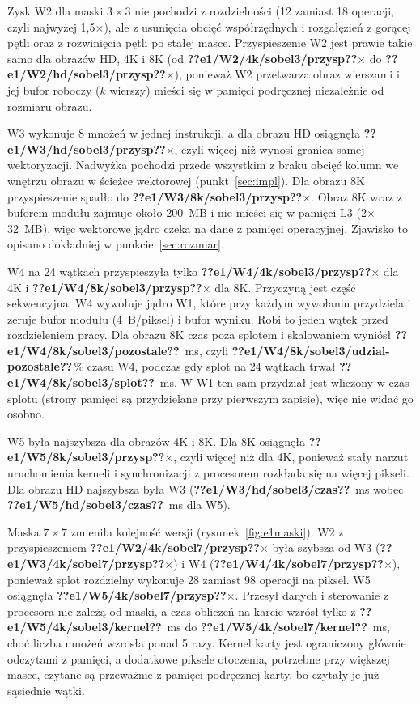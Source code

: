 \documentclass[12pt,a4paper]{article}
\providecommand{\wynik}[1]{\textbf{??#1??}}
\begin{document}
Zysk W2 dla maski $3\times3$ nie pochodzi z rozdzielności (12 zamiast 18 operacji, czyli najwyżej 1,5$\times$), ale z usunięcia obcięć współrzędnych i rozgałęzień z gorącej pętli oraz z rozwinięcia pętli po stałej masce. Przyspieszenie W2 jest prawie takie samo dla obrazów HD, 4K i 8K (od \wynik{e1/W2/4k/sobel3/przysp}$\times$ do \wynik{e1/W2/hd/sobel3/przysp}$\times$), ponieważ W2 przetwarza obraz wierszami i jej bufor roboczy ($k$ wierszy) mieści się w pamięci podręcznej niezależnie od rozmiaru obrazu.

W3 wykonuje 8 mnożeń w jednej instrukcji, a dla obrazu HD osiągnęła \wynik{e1/W3/hd/sobel3/przysp}$\times$, czyli więcej niż wynosi granica samej wektoryzacji. Nadwyżka pochodzi przede wszystkim z braku obcięć kolumn we wnętrzu obrazu w ścieżce wektorowej (punkt~\ref{sec:impl}). Dla obrazu 8K przyspieszenie spadło do \wynik{e1/W3/8k/sobel3/przysp}$\times$. Obraz 8K wraz z buforem modułu zajmuje około 200~MB i nie mieści się w pamięci L3 (2$\times$32~MB), więc wektorowe jądro czeka na dane z pamięci operacyjnej. Zjawisko to opisano dokładniej w punkcie~\ref{sec:rozmiar}.

W4 na 24 wątkach przyspieszyła tylko \wynik{e1/W4/4k/sobel3/przysp}$\times$ dla 4K i \wynik{e1/W4/8k/sobel3/przysp}$\times$ dla 8K. Przyczyną jest część sekwencyjna: W4 wywołuje jądro W1, które przy każdym wywołaniu przydziela i zeruje bufor modułu (4~B/piksel) i bufor wyniku. Robi to jeden wątek przed rozdzieleniem pracy. Dla obrazu 8K czas poza splotem i skalowaniem wyniósł \wynik{e1/W4/8k/sobel3/pozostale}~ms, czyli \wynik{e1/W4/8k/sobel3/udzial-pozostale}\,\% czasu W4, podczas gdy splot na 24 wątkach trwał \wynik{e1/W4/8k/sobel3/splot}~ms. W W1 ten sam przydział jest wliczony w czas splotu (strony pamięci są przydzielane przy pierwszym zapisie), więc nie widać go osobno.

W5 była najszybsza dla obrazów 4K i 8K. Dla 8K osiągnęła \wynik{e1/W5/8k/sobel3/przysp}$\times$, czyli więcej niż dla 4K, ponieważ stały narzut uruchomienia kerneli i synchronizacji z procesorem rozkłada się na więcej pikseli. Dla obrazu HD najszybsza była W3 (\wynik{e1/W3/hd/sobel3/czas}~ms wobec \wynik{e1/W5/hd/sobel3/czas}~ms dla W5).

Maska $7\times7$ zmieniła kolejność wersji (rysunek~\ref{fig:e1maski}). W2 z przyspieszeniem \wynik{e1/W2/4k/sobel7/przysp}$\times$ była szybsza od W3 (\wynik{e1/W3/4k/sobel7/przysp}$\times$) i W4 (\wynik{e1/W4/4k/sobel7/przysp}$\times$), ponieważ splot rozdzielny wykonuje 28 zamiast 98 operacji na piksel. W5 osiągnęła \wynik{e1/W5/4k/sobel7/przysp}$\times$. Przesył danych i sterowanie z procesora nie zależą od maski, a czas obliczeń na karcie wzrósł tylko z \wynik{e1/W5/4k/sobel3/kernel}~ms do \wynik{e1/W5/4k/sobel7/kernel}~ms, choć liczba mnożeń wzrosła ponad 5 razy. Kernel karty jest ograniczony głównie odczytami z pamięci, a dodatkowe piksele otoczenia, potrzebne przy większej masce, czytane są przeważnie z pamięci podręcznej karty, bo czytały je już sąsiednie wątki.
\end{document}

